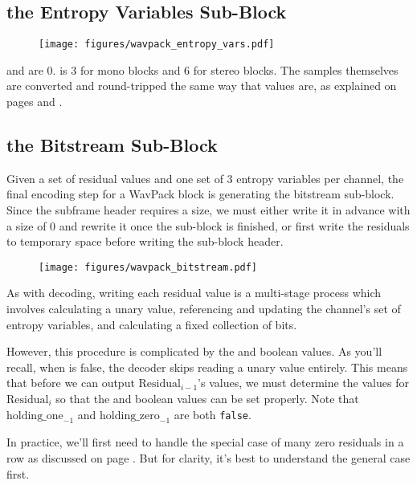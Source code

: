 \subsection{the Entropy Variables Sub-Block}

\begin{figure}[h]
\texttt{[image: figures/wavpack\_entropy\_vars.pdf]}
\end{figure}
\par
\noindent
{} and  are 0.
 is 3 for mono blocks and 6 for stereo blocks.
The samples themselves are converted and round-tripped
the same way that  values are,
as explained on pages \pageref{wavpack_encode_decorr_samples}
and \pageref{wavpack_decorr_samples}.

\clearpage

\subsection{the Bitstream Sub-Block}

Given a set of residual values and one set of 3 entropy variables per
channel, the final encoding step for a WavPack block is generating
the bitstream sub-block.
Since the subframe header requires a size, we must either
write it in advance with a size of 0 and rewrite it once
the sub-block is finished, or first write the residuals to temporary space
before writing the sub-block header.

\begin{figure}[h]
\texttt{[image: figures/wavpack\_bitstream.pdf]}
\end{figure}

As with decoding, writing each residual value is a multi-stage
process which involves calculating a unary value,
referencing and updating the channel's set of entropy variables, and
calculating a fixed collection of bits.

However, this procedure is complicated by the 
and  boolean values.
As you'll recall, when  is false, the
decoder skips reading a unary value entirely.
This means that before we can output $\text{Residual}_{i - 1}$'s values,
we must determine the values for $\text{Residual}_i$
so that the  and  boolean
values can be set properly.
Note that $\text{holding\_one}_{-1}$ and $\text{holding\_zero}_{-1}$
are both \texttt{false}.

In practice, we'll first need to handle the special case of many
zero residuals in a row as discussed on page \pageref{wavpack_zero_residuals}.
But for clarity, it's best to understand the general case first.


